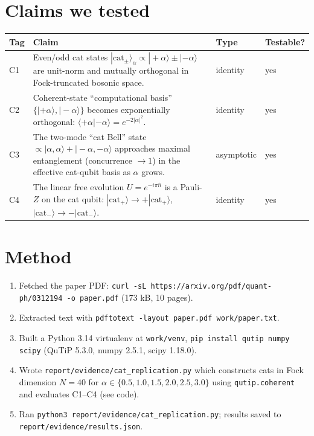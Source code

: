 \documentclass[11pt,letterpaper]{article}
\begin{document}
\section{Claims we tested}
\begin{center}
\begin{tabular}{lp{7.5cm}ll}
\toprule
Tag & Claim & Type & Testable? \\
\midrule
C1 & Even/odd cat states $|\text{cat}_\pm\rangle_\alpha \propto
     |{+}\alpha\rangle \pm |{-}\alpha\rangle$ are unit-norm and
     mutually orthogonal in Fock-truncated bosonic space. & identity & yes \\
C2 & Coherent-state ``computational basis'' $\{|{+}\alpha\rangle,
     |{-}\alpha\rangle\}$ becomes exponentially orthogonal:
     $\langle{+}\alpha|{-}\alpha\rangle = e^{-2|\alpha|^2}$. & identity & yes \\
C3 & The two-mode ``cat Bell'' state $\propto |\alpha,\alpha\rangle +
     |{-}\alpha,{-}\alpha\rangle$ approaches maximal entanglement
     (concurrence $\to 1$) in the effective cat-qubit basis as
     $\alpha$ grows. & asymptotic & yes \\
C4 & The linear free evolution $U = e^{-i\pi \hat n}$ is a Pauli-$Z$
     on the cat qubit: $|\text{cat}_+\rangle \to +|\text{cat}_+\rangle$,
     $|\text{cat}_-\rangle \to -|\text{cat}_-\rangle$. & identity & yes \\
\bottomrule
\end{tabular}
\end{center}

\section{Method}
\begin{enumerate}
  \item Fetched the paper PDF: \verb|curl -sL https://arxiv.org/pdf/quant-ph/0312194 -o paper.pdf| (173 kB, 10 pages).
  \item Extracted text with \verb|pdftotext -layout paper.pdf work/paper.txt|.
  \item Built a Python 3.14 virtualenv at \verb|work/venv|,
        \verb|pip install qutip numpy scipy|
        (QuTiP 5.3.0, numpy 2.5.1, scipy 1.18.0).
  \item Wrote \verb|report/evidence/cat_replication.py| which
        constructs cats in Fock dimension \(N=40\) for
        \(\alpha \in \{0.5, 1.0, 1.5, 2.0, 2.5, 3.0\}\) using
        \verb|qutip.coherent| and evaluates C1--C4 (see code).
  \item Ran \verb|python3 report/evidence/cat_replication.py|;
        results saved to \verb|report/evidence/results.json|.
\end{enumerate}
\end{document}
